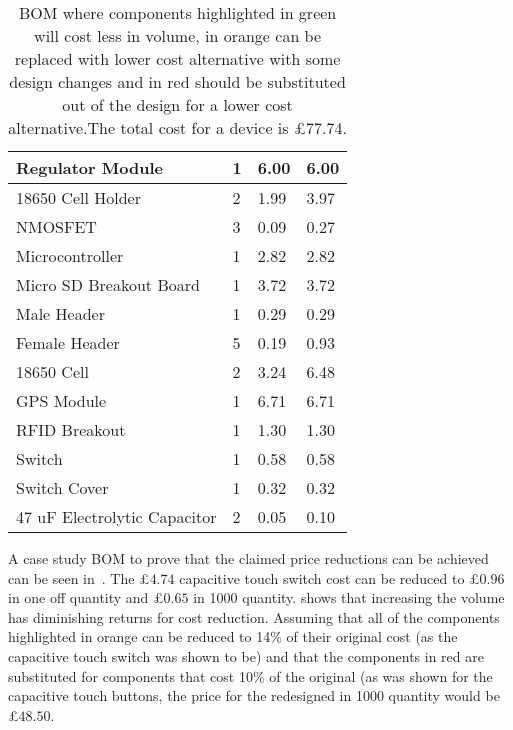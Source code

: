 \begin{table}
\begin{tabular}{|l|l|l|l|}
Regulator Module                   & 1        & 6.00      & 6.00      \\ \hline
\rowcolor[HTML]{adffca} 
18650 Cell Holder                  & 2        & 1.99      & 3.97      \\ \hline
\rowcolor[HTML]{adffca} 
NMOSFET                            & 3        & 0.09      & 0.27      \\ \hline
\rowcolor[HTML]{ffd49c} 
Microcontroller                    & 1        & 2.82      & 2.82      \\ \hline
\rowcolor[HTML]{ffd49c} 
Micro SD Breakout Board            & 1        & 3.72      & 3.72      \\ \hline
\rowcolor[HTML]{adffca} 
Male Header                        & 1        & 0.29      & 0.29      \\ \hline
\rowcolor[HTML]{adffca} 
Female Header                      & 5        & 0.19      & 0.93      \\ \hline
\rowcolor[HTML]{adffca} 
18650 Cell                         & 2        & 3.24      & 6.48      \\ \hline
\rowcolor[HTML]{ffd49c} 
GPS Module                         & 1        & 6.71      & 6.71      \\ \hline
\rowcolor[HTML]{ffd49c} 
RFID Breakout                      & 1        & 1.30      & 1.30      \\ \hline
\rowcolor[HTML]{adffca} 
Switch                             & 1        & 0.58      & 0.58      \\ \hline
\rowcolor[HTML]{adffca} 
Switch Cover                       & 1        & 0.32      & 0.32      \\ \hline
\rowcolor[HTML]{adffca} 
47 uF Electrolytic Capacitor       & 2        & 0.05      & 0.10      \\ \hline
\end{tabular} 
\captionsetup{justification = centering}
\caption{\gls{BOM} where components highlighted in green will cost less in volume, in orange can be replaced with lower cost alternative with some design changes and in red should be substituted out of the design for a lower cost alternative.The total cost for a device is £77.74.} 
\label{Table:JM_BillOM}
\end{table}

A case study \gls{BOM} to prove that the claimed price reductions can be achieved can be seen in~\cite{JM_antenna}. The £$4.74$ capacitive touch switch cost can be reduced to £$0.96$ in one off quantity and £$0.65$ in 1000 quantity.  shows that increasing the volume has diminishing returns for cost reduction. Assuming that all of the components highlighted in orange can be reduced to 14\% of their original cost (as the capacitive touch switch was shown to be) and that the components in red are substituted for components that cost 10\% of the original (as was shown for the capacitive touch buttons, the price for the redesigned  in 1000 quantity would be £$48.50$.

